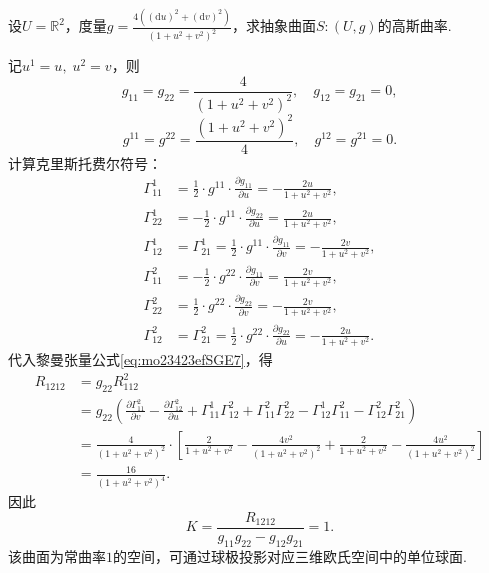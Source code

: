 \documentclass[../../main.tex]{subfiles}%
\begin{document}
\begin{example}
设$U=\mathbb{R}^2$，度量$g=\frac{4\left((\mathrm{d}u)^2+(\mathrm{d}v)^2\right)}{\left(1+u^2+v^2\right)^2}$，求抽象曲面$S:(U,g)$的高斯曲率.
\end{example}
\begin{solution}

记$u^1=u,\;u^2=v$，则
$$g_{11}=g_{22}=\frac{4}{\left(1+u^2+v^2\right)^2},\quad g_{12}=g_{21}=0,$$
$$g^{11}=g^{22}=\frac{\left(1+u^2+v^2\right)^2}{4},\quad g^{12}=g^{21}=0.$$
计算克里斯托费尔符号：
\begin{align*}
\Gamma^1_{11}&=\frac12\cdot g^{11}\cdot\frac{\partial g_{11}}{\partial u}=-\frac{2u}{1+u^2+v^2},\\
\Gamma^1_{22}&=-\frac12\cdot g^{11}\cdot\frac{\partial g_{22}}{\partial u}=\frac{2u}{1+u^2+v^2},\\
\Gamma^1_{12}&=\Gamma^1_{21}=\frac12\cdot g^{11}\cdot\frac{\partial g_{11}}{\partial v}=-\frac{2v}{1+u^2+v^2},\\
\Gamma^2_{11}&=-\frac12\cdot g^{22}\cdot\frac{\partial g_{11}}{\partial v}=\frac{2v}{1+u^2+v^2},\\
\Gamma^2_{22}&=\frac12\cdot g^{22}\cdot\frac{\partial g_{22}}{\partial v}=-\frac{2v}{1+u^2+v^2},\\
\Gamma^2_{12}&=\Gamma^2_{21}=\frac12\cdot g^{22}\cdot\frac{\partial g_{22}}{\partial u}=-\frac{2u}{1+u^2+v^2}.
\end{align*}
代入黎曼张量公式\eqref{eq:mo23423efSGE7}，得
\begin{align*}
R_{1212}&=g_{22}R^2_{112}\\
&=g_{22}\left(\frac{\partial\Gamma^2_{11}}{\partial v}-\frac{\partial\Gamma^2_{12}}{\partial u}+\Gamma^1_{11}\Gamma^2_{12}+\Gamma^2_{11}\Gamma^2_{22}-\Gamma^1_{12}\Gamma^2_{11}-\Gamma^2_{12}\Gamma^2_{21}\right)\\
&=\frac{4}{\left(1+u^2+v^2\right)^2}\cdot\left[\frac{2}{1+u^2+v^2}-\frac{4v^2}{\left(1+u^2+v^2\right)^2}+\frac{2}{1+u^2+v^2}-\frac{4u^2}{\left(1+u^2+v^2\right)^2}\right]\\
&=\frac{16}{\left(1+u^2+v^2\right)^4}.
\end{align*}
因此
$$K=\frac{R_{1212}}{g_{11}g_{22}-g_{12}g_{21}}=1.$$
该曲面为常曲率$1$的空间，可通过球极投影对应三维欧氏空间中的单位球面.
\end{solution}
\end{document}
